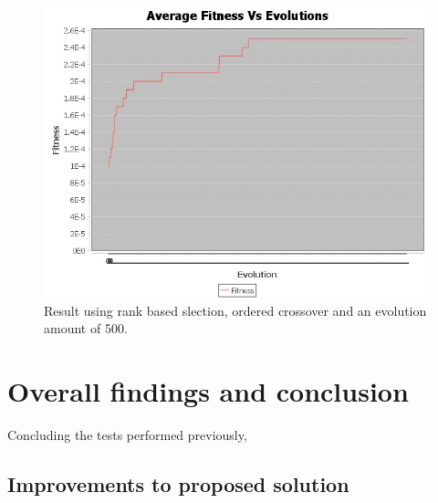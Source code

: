 \documentclass[article]{IEEEtran}
\begin{document}
\begin{figure}[H]
\centering
  \includegraphics[width=.8\linewidth]{images/averageFitnesses3}
  \caption{Result using rank based slection, ordered crossover and an evolution amount of 500.}
  \label{fig:19}
\end{figure}

\section{Overall findings and conclusion}
Concluding the tests performed previously, 

\subsection{Improvements to proposed solution}
\end{document}

